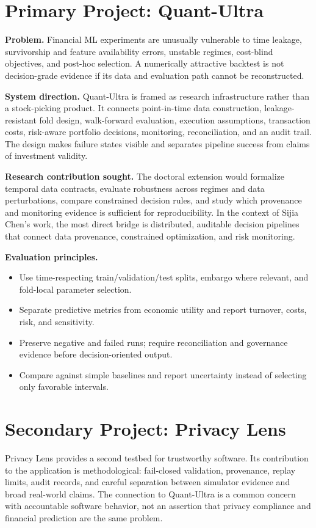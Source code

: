 \documentclass[11pt]{article}
\begin{document}
\section*{Primary Project: Quant-Ultra}
\textbf{Problem.} Financial ML experiments are unusually vulnerable to time leakage, survivorship and feature availability errors, unstable regimes, cost-blind objectives, and post-hoc selection. A numerically attractive backtest is not decision-grade evidence if its data and evaluation path cannot be reconstructed.

\textbf{System direction.} Quant-Ultra is framed as research infrastructure rather than a stock-picking product. It connects point-in-time data construction, leakage-resistant fold design, walk-forward evaluation, execution assumptions, transaction costs, risk-aware portfolio decisions, monitoring, reconciliation, and an audit trail. The design makes failure states visible and separates pipeline success from claims of investment validity.

\textbf{Research contribution sought.} The doctoral extension would formalize temporal data contracts, evaluate robustness across regimes and data perturbations, compare constrained decision rules, and study which provenance and monitoring evidence is sufficient for reproducibility. In the context of Sijia Chen's work, the most direct bridge is distributed, auditable decision pipelines that connect data provenance, constrained optimization, and risk monitoring.

\textbf{Evaluation principles.}
\begin{itemize}
\item Use time-respecting train/validation/test splits, embargo where relevant, and fold-local parameter selection.
\item Separate predictive metrics from economic utility and report turnover, costs, risk, and sensitivity.
\item Preserve negative and failed runs; require reconciliation and governance evidence before decision-oriented output.
\item Compare against simple baselines and report uncertainty instead of selecting only favorable intervals.
\end{itemize}

\section*{Secondary Project: Privacy Lens}
Privacy Lens provides a second testbed for trustworthy software. Its contribution to the application is methodological: fail-closed validation, provenance, replay limits, audit records, and careful separation between simulator evidence and broad real-world claims. The connection to Quant-Ultra is a common concern with accountable software behavior, not an assertion that privacy compliance and financial prediction are the same problem.
\end{document}

